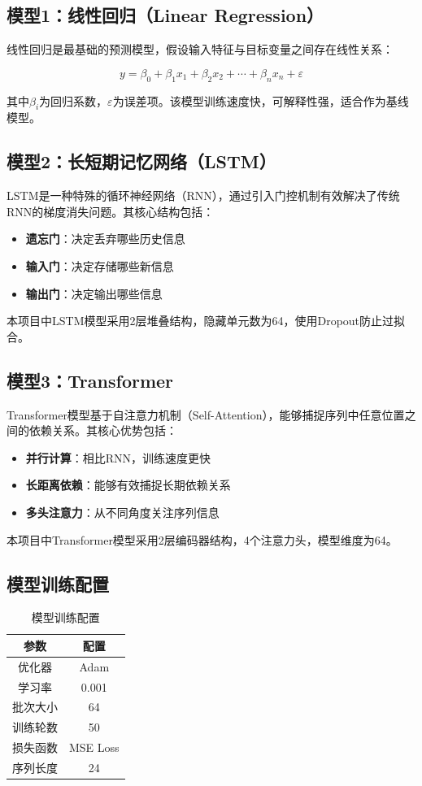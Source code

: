\documentclass[12pt,a4paper]{article}
\begin{document}
\subsection{模型1：线性回归（Linear Regression）}
线性回归是最基础的预测模型，假设输入特征与目标变量之间存在线性关系：

\begin{equation}
y = \beta_0 + \beta_1 x_1 + \beta_2 x_2 + \cdots + \beta_n x_n + \varepsilon
\end{equation}

其中$\beta_i$为回归系数，$\varepsilon$为误差项。该模型训练速度快，可解释性强，适合作为基线模型。

\subsection{模型2：长短期记忆网络（LSTM）}
LSTM是一种特殊的循环神经网络（RNN），通过引入门控机制有效解决了传统RNN的梯度消失问题。其核心结构包括：

\begin{itemize}
    \item \textbf{遗忘门}：决定丢弃哪些历史信息
    \item \textbf{输入门}：决定存储哪些新信息
    \item \textbf{输出门}：决定输出哪些信息
\end{itemize}

本项目中LSTM模型采用2层堆叠结构，隐藏单元数为64，使用Dropout防止过拟合。

\subsection{模型3：Transformer}
Transformer模型基于自注意力机制（Self-Attention），能够捕捉序列中任意位置之间的依赖关系。其核心优势包括：

\begin{itemize}
    \item \textbf{并行计算}：相比RNN，训练速度更快
    \item \textbf{长距离依赖}：能够有效捕捉长期依赖关系
    \item \textbf{多头注意力}：从不同角度关注序列信息
\end{itemize}

本项目中Transformer模型采用2层编码器结构，4个注意力头，模型维度为64。

\subsection{模型训练配置}
\begin{table}[H]
\centering
\caption{模型训练配置}
\label{tab:config}
\begin{tabular}{c|c}
\hline
\textbf{参数} & \textbf{配置} \\
\hline
优化器 & Adam \\
学习率 & 0.001 \\
批次大小 & 64 \\
训练轮数 & 50 \\
损失函数 & MSE Loss \\
序列长度 & 24 \\
\hline
\end{tabular}
\end{table}
\end{document}
